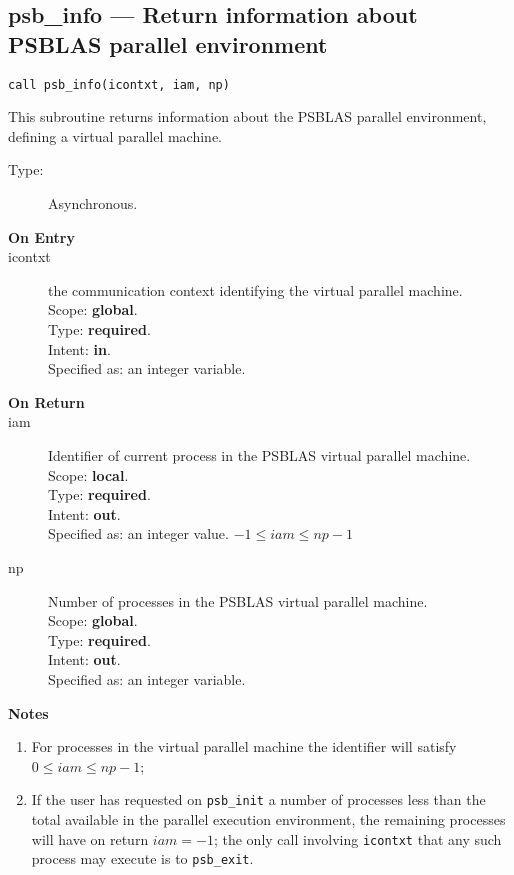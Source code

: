 \clearpage\subsection*{psb\_info --- Return information about  PSBLAS parallel
  environment}

\begin{verbatim}
call psb_info(icontxt, iam, np)
\end{verbatim}

This subroutine returns information about  the PSBLAS parallel environment, defining
a virtual parallel machine.
\begin{description}
\item[Type:] Asynchronous.
\item[\bf  On Entry ]
\item[icontxt] the communication context identifying the virtual
  parallel machine.\\
Scope: {\bf global}.\\
Type: {\bf required}.\\
Intent: {\bf in}.\\
Specified as: an integer variable.
\end{description}

\begin{description}
\item[\bf On Return]
\item[iam] Identifier of current  process in the PSBLAS virtual parallel machine.\\
Scope: {\bf local}.\\
Type: {\bf required}.\\
Intent: {\bf out}.\\
Specified as: an integer value. $-1 \le iam \le np-1$\
\item[np] Number of processes in the PSBLAS virtual parallel machine.\\
Scope: {\bf global}.\\
Type: {\bf required}.\\
Intent: {\bf out}.\\
Specified as: an integer variable. \
\end{description}


{\par\noindent\large\bfseries Notes}
\begin{enumerate}
\item For processes in the virtual parallel machine  the identifier
  will satisfy $0 \le iam \le np-1$;
\item If the user has requested on \verb|psb_init| a number of
  processes less than the total available in the parallel execution
  environment, the remaining processes will have on return $iam=-1$;
  the only call involving \verb|icontxt| that any such process may
  execute is  to \verb|psb_exit|. 
\end{enumerate}


